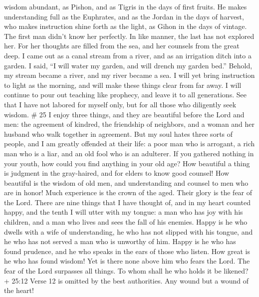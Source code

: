 wisdom abundant, as Pishon, and as Tigris in the days of first fruits.
 He makes understanding full as the Euphrates, and as the
Jordan in the days of harvest,  who makes instruction shine
forth as the light, as Gihon in the days of vintage.  The
first man didn't know her perfectly. In like manner, the last has not
explored her.  For her thoughts are filled from the sea,
and her counsels from the great deep.  I came out as a
canal stream from a river, and as an irrigation ditch into a garden.
 I said, ``I will water my garden, and will drench my
garden bed.'' Behold, my stream became a river, and my river became a
sea.  I will yet bring instruction to light as the morning,
and will make these things clear from far away.  I will
continue to pour out teaching like prophecy, and leave it to all
generations.  See that I have not labored for myself only,
but for all those who diligently seek wisdom. \# 25  I enjoy
three things, and they are beautiful before the Lord and men: the
agreement of kindred, the friendship of neighbors, and a woman and her
husband who walk together in agreement.  But my soul hates
three sorts of people, and I am greatly offended at their life: a poor
man who is arrogant, a rich man who is a liar, and an old fool who is an
adulterer.  If you gathered nothing in your youth, how could
you find anything in your old age?  How beautiful a thing is
judgment in the gray-haired, and for elders to know good counsel!
 How beautiful is the wisdom of old men, and understanding
and counsel to men who are in honor!  Much experience is the
crown of the aged. Their glory is the fear of the Lord. 
There are nine things that I have thought of, and in my heart counted
happy, and the tenth I will utter with my tongue: a man who has joy with
his children, and a man who lives and sees the fall of his enemies.
 Happy is he who dwells with a wife of understanding, he who
has not slipped with his tongue, and he who has not served a man who is
unworthy of him.  Happy is he who has found prudence, and he
who speaks in the ears of those who listen.  How great is
he who has found wisdom! Yet is there none above him who fears the Lord.
 The fear of the Lord surpasses all things. To whom shall
he who holds it be likened?  + 25:12 Verse 12 is omitted by
the best authorities.  Any wound but a wound of the heart!
